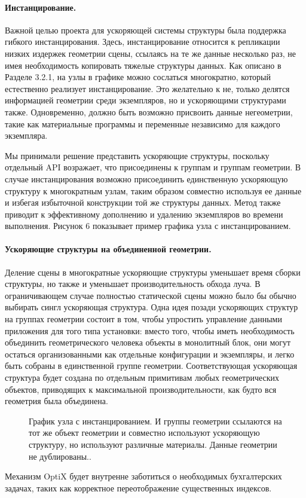  \paragraph{Инстанцирование.} Важной целью проекта для ускоряющей системы структуры была поддержка гибкого инстанцирования. Здесь, инстанцирование относится к репликации низких издержек геометрии сцены, ссылаясь на те же данные несколько раз, не имея необходимость копировать тяжелые структуры данных. Как описано в Разделе 3.2.1, на узлы в графике можно сослаться многократно, который естественно реализует инстанцирование. Это желательно к не, только делятся информацией геометрии среди экземпляров, но и ускоряющими структурами также. Одновременно, должно быть возможно присвоить данные негеометрии, такие как материальные программы и переменные независимо для каждого экземпляра. 
  
  Мы принимали решение представить ускоряющие структуры, поскольку отдельный API возражает, что присоединены к группам и группам геометрии. В случае инстанцирования возможно присоединить единственную ускоряющую структуру к многократным узлам, таким образом совместно используя ее данные и избегая избыточной конструкции той же структуры данных. Метод также приводит к эффективному дополнению и удалению экземпляров во времени выполнения. Рисунок 6 показывает пример графика узла с инстанцированием.
\paragraph{Ускоряющие структуры на объединенной геометрии.} Деление сцены в многократные ускоряющие структуры уменьшает время сборки структуры, но также и уменьшает производительность обхода луча. В ограничивающем случае полностью статической сцены можно было бы обычно выбирать сингл ускоряющая структура. Одна идея позади ускоряющих структур на группах геометрии состоит в том, чтобы упростить управление данными приложения для того типа установки: вместо того, чтобы иметь необходимость объединить геометрического человека объекты в монолитный блок, они могут остаться организованными как отдельные конфигурации и экземпляры, и легко быть собраны в единственной группе геометрии. Соответствующая ускоряющая структура будет создана по отдельным примитивам любых геометрических объектов, приводящих к максимальной производительности, как будто вся геометрия была объединена.

\begin{figure}[h!]
\caption{График узла с инстанцированием. И группы геометрии ссылаются на тот же объект геометрии и совместно используют ускоряющую структуру, но используют различные материалы. Данные геометрии не дублированы..}
\label{fig3}
\end{figure}
Механизм OptiX будет внутренне заботиться о необходимых бухгалтерских задачах, таких как корректное переотображение существенных индексов.

